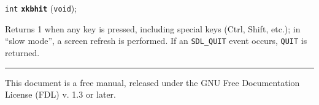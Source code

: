 \documentclass[a4paper,12pt]{article}
\newcommand{\V}{\texttt{void}}      %
\newcommand{\I}{\texttt{int}}       %
\newcommand{\func}[1]{\textbf{\texttt{#1}}}  %
\newcommand{\T}[1]{\texttt{#1}}     %
\newenvironment{bgi}
{ %
  \begin{snugshade}
}
{ %
  \end{snugshade}
}
\begin{document}

\label{sec:xkbhit}

\begin{bgi}
\I{} \func{xkbhit} (\V{});
\end{bgi}

Returns 1 when any key is pressed, including special keys (Ctrl, Shift,
etc.); in ``slow mode'', a screen refresh is performed. If an
\T{SDL\_QUIT} event occurs, \T{QUIT} is returned.


\bigskip

\rule{\linewidth}{0.2pt}

This document is a free manual, released under the GNU Free
Documentation License (FDL) v. 1.3 or later.
\end{document}
